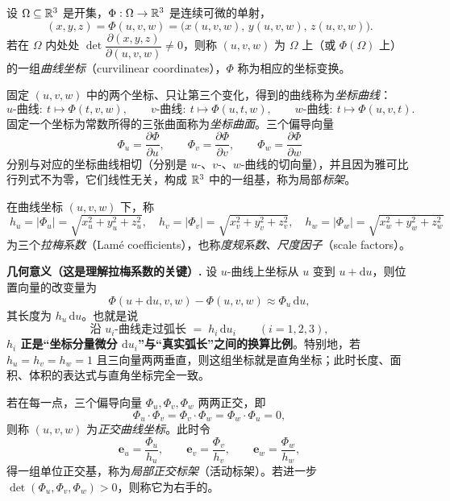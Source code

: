 \begin{definition}[曲线坐标]
设 \(\Omega\subseteq\mathbb{R}^3\) 是开集，\(\Phi:\Omega\to\mathbb{R}^3\) 是连续可微的单射，
\[
(x,y,z)=\Phi(u,v,w)=\bigl(x(u,v,w),\,y(u,v,w),\,z(u,v,w)\bigr).
\]
若在 \(\Omega\) 内处处 \(\det\dfrac{\partial(x,y,z)}{\partial(u,v,w)}\ne0\)，则称 \((u,v,w)\) 为 \(\Omega\) 上（或 \(\Phi(\Omega)\) 上）的一组\emph{曲线坐标}（curvilinear coordinates），\(\Phi\) 称为相应的坐标变换。
\end{definition}

\begin{definition}
固定 \((u,v,w)\) 中的两个坐标、只让第三个变化，得到的曲线称为\emph{坐标曲线}：
\[
u\text{-曲线}:\ t\mapsto\Phi(t,v,w),\qquad
v\text{-曲线}:\ t\mapsto\Phi(u,t,w),\qquad
w\text{-曲线}:\ t\mapsto\Phi(u,v,t).
\]
固定一个坐标为常数所得的三张曲面称为\emph{坐标曲面}。三个偏导向量
\[
\Phi_u=\frac{\partial\Phi}{\partial u},\qquad
\Phi_v=\frac{\partial\Phi}{\partial v},\qquad
\Phi_w=\frac{\partial\Phi}{\partial w}
\]
分别与对应的坐标曲线相切（分别是 \(u\)-、\(v\)-、\(w\)-曲线的切向量），并且因为雅可比行列式不为零，它们线性无关，构成 \(\mathbb{R}^3\) 中的一组基，称为局部\emph{标架}。
\end{definition}

\begin{definition}[拉梅系数]
在曲线坐标 \((u,v,w)\) 下，称
\[
\boxed{\;h_u=\left|\Phi_u\right|=\sqrt{x_u^2+y_u^2+z_u^2},\quad
h_v=\left|\Phi_v\right|=\sqrt{x_v^2+y_v^2+z_v^2},\quad
h_w=\left|\Phi_w\right|=\sqrt{x_w^2+y_w^2+z_w^2}\;}
\]
为三个\emph{拉梅系数}（Lamé coefficients），也称\emph{度规系数}、\emph{尺度因子}（scale factors）。
\end{definition}

\noindent\textbf{几何意义（这是理解拉梅系数的关键）.} 设 \(u\)-曲线上坐标从 \(u\) 变到 \(u+\mathrm{d}u\)，则位置向量的改变量为
\[
\Phi(u+\mathrm{d}u,v,w)-\Phi(u,v,w)\approx\Phi_u\,\mathrm{d}u ,
\]
其长度为 \(h_u\,\mathrm{d}u\)。也就是说
\[
\text{沿 }u_i\text{-曲线走过弧长 }=\;h_i\,\mathrm{d}u_i\qquad(i=1,2,3),
\]
\textbf{\(h_i\) 正是“坐标分量微分 \(\mathrm{d}u_i\)”与“真实弧长”之间的换算比例}。特别地，若 \(h_u=h_v=h_w=1\) 且三向量两两垂直，则这组坐标就是直角坐标；此时长度、面积、体积的表达式与直角坐标完全一致。

\begin{definition}[正交曲线坐标]
若在每一点，三个偏导向量 \(\Phi_u,\Phi_v,\Phi_w\) 两两正交，即
\[
\Phi_u\cdot\Phi_v=\Phi_v\cdot\Phi_w=\Phi_w\cdot\Phi_u=0 ,
\]
则称 \((u,v,w)\) 为\emph{正交曲线坐标}。此时令
\[
\mathbf{e}_u=\frac{\Phi_u}{h_u},\qquad
\mathbf{e}_v=\frac{\Phi_v}{h_v},\qquad
\mathbf{e}_w=\frac{\Phi_w}{h_w},
\]
得一组单位正交基，称为\emph{局部正交标架}（活动标架）。若进一步 \(\det(\Phi_u,\Phi_v,\Phi_w)>0\)，则称它为右手的。
\end{definition}

